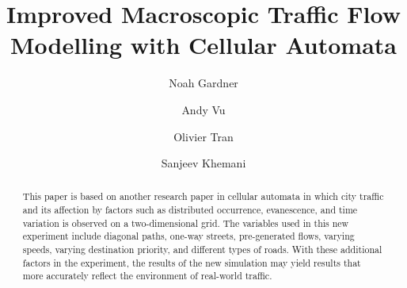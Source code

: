 \documentclass[sigplan,screen]{acmart}
\begin{document}
\title{Improved Macroscopic Traffic Flow Modelling with Cellular Automata}

\author{Noah Gardner}

\author{Andy Vu}
\authornotemark[1]

\author{Olivier Tran}
\authornotemark[1]

\author{Sanjeev Khemani}
\authornotemark[1]

\renewcommand{\shortauthors}{Gardner et al.}

\begin{abstract}
    This paper is based on another research paper in cellular automata in which
    city traffic and its affection by factors such as distributed occurrence,
    evanescence, and time variation is observed on a two-dimensional grid. The
    variables used in this new experiment include diagonal paths, one-way
    streets, pre-generated flows, varying speeds, varying destination priority,
    and different types of roads. With these additional factors in the
    experiment, the results of the new simulation may yield results that more
    accurately reflect the environment of real-world traffic.
\end{abstract}
\end{document}
